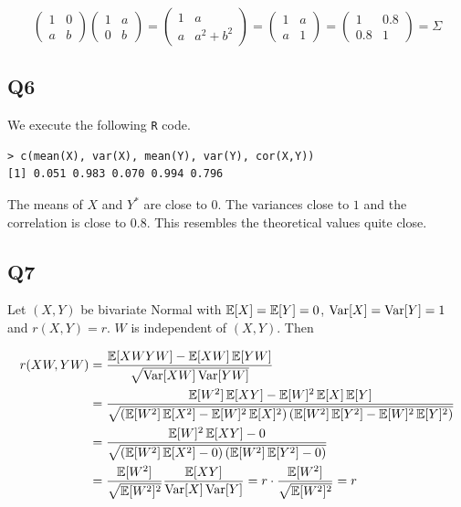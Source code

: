 \begin{displaymath}
\begin{pmatrix}
1 & 0 \\
a & b
\end{pmatrix}
\begin{pmatrix}
1 & a \\
0 & b
\end{pmatrix}
=
\begin{pmatrix}
1 & a \\
a & a^2 + b^2
\end{pmatrix}
=
\begin{pmatrix}
1 & a \\
a & 1
\end{pmatrix}
=
\begin{pmatrix}
1 & 0.8 \\
0.8 & 1
\end{pmatrix}
= \Sigma
\end{displaymath}

\subsection*{Q6}
We execute the following \verb|R| code.
\begin{verbatim}
> c(mean(X), var(X), mean(Y), var(Y), cor(X,Y))
[1] 0.051 0.983 0.070 0.994 0.796
\end{verbatim}

The means of $X$ and $Y^*$ are close to $0$. The variances close to $1$ and the correlation is close to $0.8$. This resembles the theoretical values quite close.

\subsection*{Q7}
Let $(X, Y)$ be bivariate Normal with $\E[X] = \E[Y] = 0$, $\Var[X] = \Var[Y] = 1$ and $r(X,Y) = r$. $W$ is independent of $(X, Y)$. Then

\begin{align*}
r(XW, YW) & = \frac{\E[XWYW] - \E[XW]\E[YW]}{\sqrt{\Var[XW] \Var[YW]}} \\
	      & = \frac{\E[W^2]\E[XY] - \E[W]^2\E[X]\E[Y]}{\sqrt{\left(\E[W^2]\E[X^2] - \E[W]^2\E[X]^2\right)\left(\E[W^2]\E[Y^2] - \E[W]^2\E[Y]^2\right)}} \\
	      & = \frac{\E[W]^2\E[XY] - 0}{\sqrt{\left(\E[W^2]\E[X^2] - 0\right)\left(\E[W^2]\E[Y^2] - 0\right)}} \\ 
	      & = \frac{\E[W^2]}{\sqrt{\E[W^2]^2}} \frac{\E[XY]}{\Var[X]\Var[Y]} = r \cdot \frac{\E[W^2]}{\sqrt{\E[W^2]^2}} = r
\end{align*}

